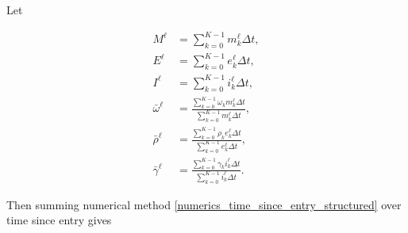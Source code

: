 \documentclass{jpmarticle}
\let\subequationsorig\subequations%
\let\endsubequationsorig\endsubequations%
\renewenvironment{subequations}{
  \subequationsorig
  \renewcommand{\theequation}{\theparentequation.\arabic{equation}}
}{
  \endsubequationsorig
}
\begin{document}
Let
\begin{subequations}
  \begin{align}
    M^{\ell}
    &= \sum_{k = 0}^{K - 1} m_k^{\ell} \Delta t,
    \\
    E^{\ell}
    &= \sum_{k = 0}^{K - 1} e_k^{\ell} \Delta t,
    \\
    I^{\ell}
    &= \sum_{k = 0}^{K - 1} i_k^{\ell} \Delta t,
    \\
    \bar{\omega}^{\ell}
    &= \frac{\sum_{k = 0}^{K - 1} \omega_k m_k^{\ell} \Delta t}
      {\sum_{k = 0}^{K - 1} m_k^{\ell} \Delta t},
    \\
    \bar{\rho}^{\ell}
    &= \frac{\sum_{k = 0}^{K - 1} \rho_k e_k^{\ell} \Delta t}
      {\sum_{k = 0}^{K - 1} e_k^{\ell} \Delta t},
    \\
    \bar{\gamma}^{\ell}
    &= \frac{\sum_{k = 0}^{K - 1} \gamma_k i_k^{\ell} \Delta t}
      {\sum_{k = 0}^{K - 1} i_k^{\ell} \Delta t}.
  \end{align}
\end{subequations}
Then summing numerical method
\eqref{numerics_time_since_entry_structured} over time since entry
gives
\end{document}
